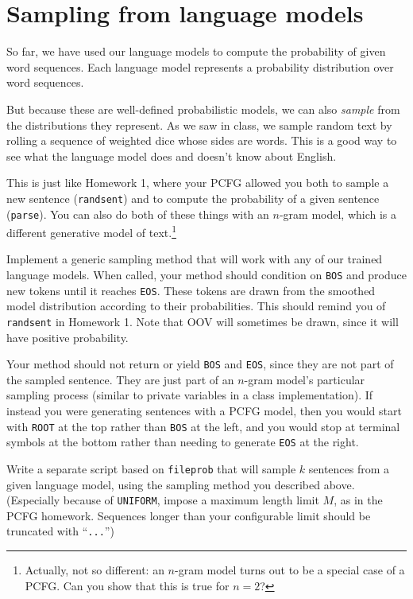 \documentclass[12pt]{article}
\theoremstyle{plain}
\theoremstyle{definition}
\theoremstyle{remark}
\begin{document}
\section{Sampling from language models}

So far, we have used our language models to compute the probability of given word sequences. Each language model represents a probability distribution over word sequences.

But because these are well-defined probabilistic models, we can also \textit{sample} from the distributions they represent. As we saw in class, we sample random text by rolling a sequence of weighted dice whose sides are words. This is a good way to see what the language model does and doesn’t know about English.

This is just like Homework 1, where your PCFG allowed you both to sample a new sentence (\texttt{randsent}) and to compute the probability of a given sentence (\texttt{parse}). You can also do both of these things with an $n$-gram model, which is a different generative model of text.\footnote{Actually, not so different: an $n$-gram model turns out to be a special case of a PCFG. Can you show that this is true for $n=2$?}

Implement a generic sampling method that will work with any of our trained language models. When called, your method should condition on \texttt{BOS} and produce new tokens until it reaches \texttt{EOS}. These tokens are drawn from the smoothed model distribution according to their probabilities. This should remind you of \texttt{randsent} in Homework 1. Note that OOV will sometimes be drawn, since it will have positive probability.

Your method should not return or yield \texttt{BOS} and \texttt{EOS}, since they are not part of the sampled sentence. They are just part of an $n$-gram model’s particular sampling process (similar to private variables in a class implementation). If instead you were generating sentences with a PCFG model, then you would start with \texttt{ROOT} at the top rather than \texttt{BOS} at the left, and you would stop at terminal symbols at the bottom rather than needing to generate \texttt{EOS} at the right.

Write a separate script based on \texttt{fileprob} that will sample $k$ sentences from a given language model, using the sampling method you described above. (Especially because of \texttt{UNIFORM}, impose a maximum length limit $M$, as in the PCFG homework. Sequences longer than your configurable limit should be truncated with ``\texttt{...}'')
\end{document}
